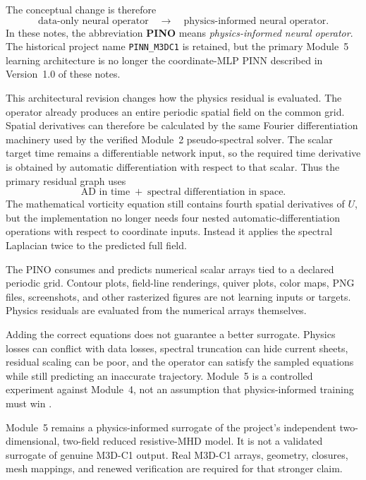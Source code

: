 \documentclass[11pt]{article}
\newcommand{\code}[1]{\texttt{#1}}
\begin{document}
The conceptual change is therefore
\[
\text{data-only neural operator}
\quad\longrightarrow\quad
\text{physics-informed neural operator}.
\]
In these notes, the abbreviation \textbf{PINO} means \emph{physics-informed neural operator}. The historical project name \code{PINN\_M3DC1} is retained, but the primary Module~5 learning architecture is no longer the coordinate-MLP PINN described in Version~1.0 of these notes.

This architectural revision changes how the physics residual is evaluated. The operator already produces an entire periodic spatial field on the common grid. Spatial derivatives can therefore be calculated by the same Fourier differentiation machinery used by the verified Module~2 pseudo-spectral solver. The scalar target time remains a differentiable network input, so the required time derivative is obtained by automatic differentiation with respect to that scalar. Thus the primary residual graph uses
\[
\boxed{\text{AD in time} \; + \; \text{spectral differentiation in space}.}
\]
The mathematical vorticity equation still contains fourth spatial derivatives of $U$, but the implementation no longer needs four nested automatic-differentiation operations with respect to coordinate inputs. Instead it applies the spectral Laplacian twice to the predicted full field.

\begin{warningbox}
The PINO consumes and predicts numerical scalar arrays tied to a declared periodic grid. Contour plots, field-line renderings, quiver plots, color maps, PNG files, screenshots, and other rasterized figures are not learning inputs or targets. Physics residuals are evaluated from the numerical arrays themselves.
\end{warningbox}

\begin{warningbox}
Adding the correct equations does not guarantee a better surrogate. Physics losses can conflict with data losses, spectral truncation can hide current sheets, residual scaling can be poor, and the operator can satisfy the sampled equations while still predicting an inaccurate trajectory. Module~5 is a controlled experiment against Module~4, not an assumption that physics-informed training must win \cite{Wang2021Gradients,Krishnapriyan2021}.
\end{warningbox}

\begin{warningbox}
Module~5 remains a physics-informed surrogate of the project's independent two-dimensional, two-field reduced resistive-MHD model. It is not a validated surrogate of genuine M3D-C1 output. Real M3D-C1 arrays, geometry, closures, mesh mappings, and renewed verification are required for that stronger claim.
\end{warningbox}
\end{document}
